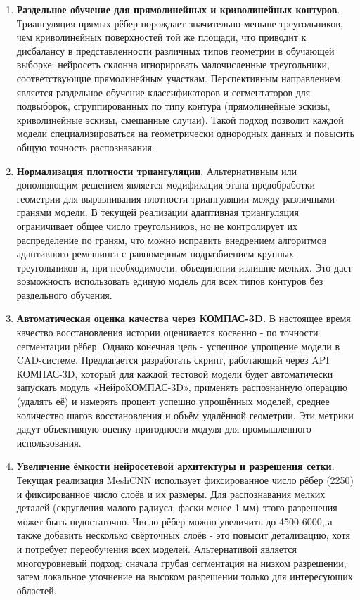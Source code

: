 \begin{enumerate}
    \item \textbf{Раздельное обучение для прямолинейных и криволинейных контуров}. Триангуляция прямых рёбер порождает значительно меньше треугольников, чем криволинейных поверхностей той же площади, что приводит к дисбалансу в представленности различных типов геометрии в обучающей выборке: нейросеть склонна игнорировать малочисленные треугольники, соответствующие прямолинейным участкам. Перспективным направлением является раздельное обучение классификаторов и сегментаторов для подвыборок, сгруппированных по типу контура (прямолинейные эскизы, криволинейные эскизы, смешанные случаи). Такой подход позволит каждой модели специализироваться на геометрически однородных данных и повысить общую точность распознавания.

    \item \textbf{Нормализация плотности триангуляции}. Альтернативным или дополняющим решением является модификация этапа предобработки геометрии для выравнивания плотности триангуляции между различными гранями модели. В текущей реализации адаптивная триангуляция ограничивает общее число треугольников, но не контролирует их распределение по граням, что можно исправить внедрением алгоритмов адаптивного ремешинга с равномерным подразбиением крупных треугольников и, при необходимости, объединении излишне мелких. Это даст возможность использовать единую модель для всех типов контуров без раздельного обучения.

    \item \textbf{Автоматическая оценка качества через КОМПАС-3D}. В настоящее время качество восстановления истории оценивается косвенно - по точности сегментации рёбер. Однако конечная цель - успешное упрощение модели в CAD-системе. Предлагается разработать скрипт, работающий через API КОМПАС-3D, который для каждой тестовой модели будет автоматически запускать модуль «НейроКОМПАС-3D», применять распознанную операцию (удалять её) и измерять процент успешно упрощённых моделей, среднее количество шагов восстановления и объём удалённой геометрии. Эти метрики дадут объективную оценку пригодности модуля для промышленного использования.

    \item \textbf{Увеличение ёмкости нейросетевой архитектуры и разрешения сетки}. Текущая реализация MeshCNN использует фиксированное число рёбер (2250) и фиксированное число слоёв и их размеры. Для распознавания мелких деталей (скругления малого радиуса, фаски менее 1 мм) этого разрешения может быть недостаточно. Число рёбер можно увеличить до 4500-6000, а также добавить несколько свёрточных слоёв - это повысит детализацию, хотя и потребует переобучения всех моделей. Альтернативой является многоуровневый подход: сначала грубая сегментация на низком разрешении, затем локальное уточнение на высоком разрешении только для интересующих областей.
\end{enumerate}

